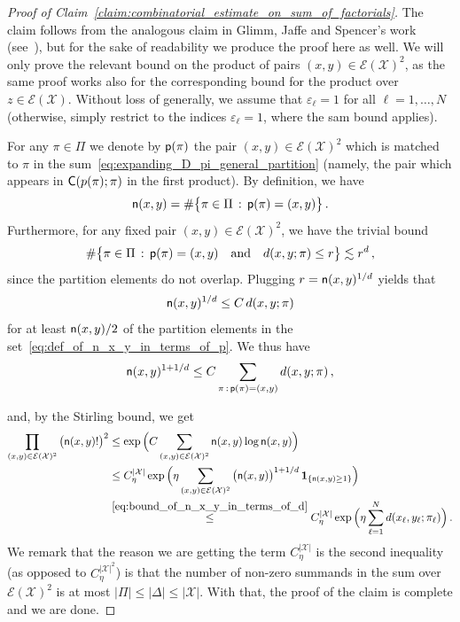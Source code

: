 \documentclass[11pt]{article}
\theoremstyle{definition}
\theoremstyle{remark}
\numberwithin{theorem}{section}
\def\eps{{\varepsilon}}
\newcommand{\cE}{\mathcal{E}}
\begin{document}
    \begin{proof}[Proof of Claim~\ref{claim:combinatorial_estimate_on_sum_of_factorials}]
        The claim follows from the analogous claim in Glimm, Jaffe and Spencer's work (see~\cite[Lemma~10.2]{Glimm-Jaffe-Spencer}), but for the sake of readability we produce the proof here as well. We will only prove the relevant bound on the product of pairs $(x,y)\in \cE(\mathcal{X})^2$, as the same proof works also for the corresponding bound for the product over $z\in \cE(\mathcal{X})$. Without loss of generally, we assume that $\eps_\ell = 1$ for all $\ell=1,\ldots, N$ (otherwise, simply restrict to the indices $\eps_\ell = 1$, where the sam bound applies). 
        
        For any $\pi\in \Pi$ we denote by ${\sf p}(\pi)$ the pair $(x,y)\in \cE(\mathcal{X})^2$ which is matched to $\pi$ in the sum~\eqref{eq:expanding_D_pi_general_partition} (namely, the pair which appears in ${\sf C}(p(\pi);\pi)$ in the first product). By definition, we have 
        \begin{equation} \label{eq:def_of_n_x_y_in_terms_of_p}
        {\sf n}(x,y) = \# \big\{ \pi \in \Pi \, : \, {\sf p}(\pi) = (x,y) \big\} \, .    
        \end{equation}
        Furthermore, for any fixed pair $(x,y)\in \cE(\mathcal{X})^2$, we have the trivial bound
        \[
        \# \big\{ \pi \in \Pi \, : \, {\sf p}(\pi) = (x,y)  \quad \text{and} \quad d(x,y;\pi) \le r \big\} \lesssim r^d \, ,
        \]
        since the partition elements do not overlap. 
        Plugging $r= {\sf n}(x,y)^{1/d}$ yields that 
        \[
        {\sf n}(x,y)^{1/d} \le C \, d(x,y;\pi)
        \]
        for at least ${\sf n}(x,y)/2$ of the partition elements in the set~\eqref{eq:def_of_n_x_y_in_terms_of_p}. We thus have
        \begin{equation} \label{eq:bound_of_n_x_y_in_terms_of_d}
        {\sf n}(x,y)^{1+1/d} \le C \sum_{\pi \, : \,  {\sf p}(\pi) = (x,y)} d(x,y;\pi) \, ,    
        \end{equation}
        
        and, by the Stirling bound, we get
        \begin{align*}
            \prod_{(x,y)\in \cE(\mathcal{X})^2} \big({\sf n}(x,y)!\big)^2  & \le \exp\Big( C \sum_{(x,y) \in \cE(\mathcal{X})^2} {\sf n}(x,y) \log {\sf n}(x,y) \Big) \\ &\le C_\eta^{|\mathcal{X}|} \exp\Big( \eta \sum_{(x,y) \in \cE(\mathcal{X})^2} \big({\sf n}(x,y)\big)^{1+1/d} \, \mathbf{1}_{\{{\sf n}(x,y) \ge 1\}} \Big) \\ &\stackrel{\eqref{eq:bound_of_n_x_y_in_terms_of_d}}{\le}  C_\eta^{|\mathcal{X}|} \exp\Big( \eta \sum_{\ell=1}^{N}  d(x_\ell,y_\ell;\pi_\ell) \Big) \, .
        \end{align*}
        We remark that the reason we are getting the term $C_\eta^{|\mathcal{X}|}$ is the second inequality (as opposed to $C_\eta^{|\mathcal{X}|^2}$) is that the number of non-zero summands in the sum over $\cE(\mathcal{X})^2$ is at most $|\Pi| \le |\Delta| \le |\mathcal{X}|$. With that, the proof of the claim is complete and we are done. 
    \end{proof}
\end{document}
